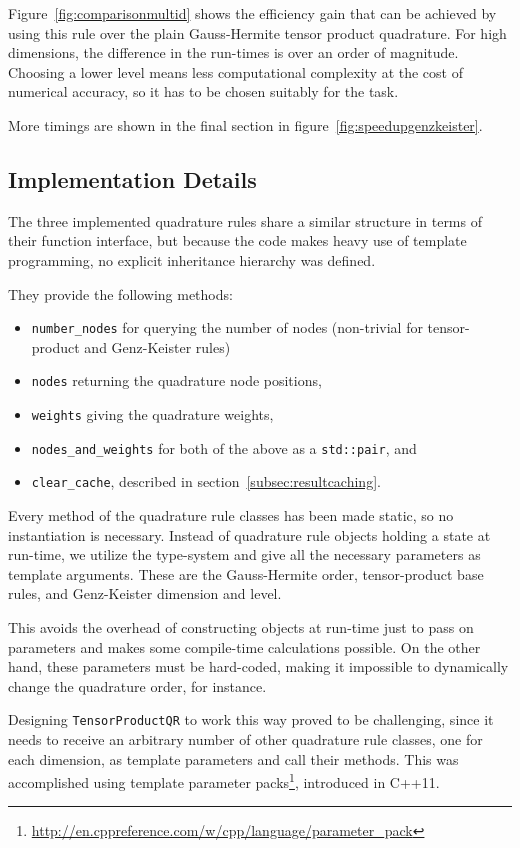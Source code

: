 Figure~\ref{fig:comparisonmultid} shows the efficiency gain that can be achieved
by using this rule over the plain Gauss-Hermite tensor product quadrature.
For high dimensions, the difference in the run-times is over an order of
magnitude.
Choosing a lower level means less computational complexity at the cost of
numerical accuracy, so it has to be chosen suitably for the task.

More timings are shown in the final section in
figure~\ref{fig:speedupgenzkeister}.


\subsection{Implementation Details}

The three implemented quadrature rules share a similar structure in terms of
their function interface, but because the code makes heavy use of template
programming, no explicit inheritance hierarchy was defined.

They provide the following methods:
\begin{itemize}
  \item \texttt{number\_nodes} for querying the number of nodes (non-trivial for
    tensor-product and Genz-Keister rules)
  \item \texttt{nodes} returning the quadrature node positions,
  \item \texttt{weights} giving the quadrature weights,
  \item \texttt{nodes\_and\_weights} for both of the above as a
    \texttt{std::pair}, and
  \item \texttt{clear\_cache}, described in section~\ref{subsec:resultcaching}.
\end{itemize}

Every method of the quadrature rule classes has been made static, so no
instantiation is necessary.
Instead of quadrature rule objects holding a state at run-time, we utilize the
type-system and give all the necessary parameters as template arguments.
These are the Gauss-Hermite order, tensor-product base rules, and Genz-Keister
dimension and level.

This avoids the overhead of constructing objects at run-time just to pass on
parameters and makes some compile-time calculations possible.
On the other hand, these parameters must be hard-coded, making it impossible to
dynamically change the quadrature order, for instance.

Designing \texttt{TensorProductQR} to work this way proved to be challenging,
since it needs to receive an arbitrary number of other quadrature rule classes,
one for each dimension, as template parameters and call their methods.
This was accomplished using template parameter
packs\footnote{\url{http://en.cppreference.com/w/cpp/language/parameter_pack}},
introduced in C++11.


